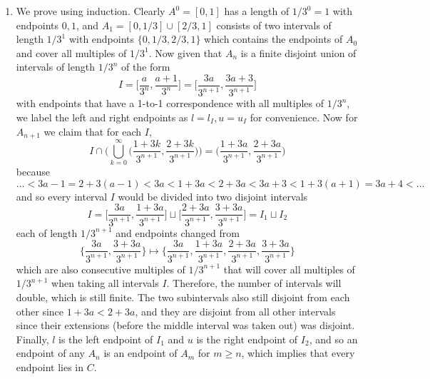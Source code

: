\begin{solution}
\begin{enumerate}
      \item We prove using induction. Clearly $A^0 = [0, 1]$ has a length of $ 1/3^0 = 1$ with endpoints $0, 1$, and $A_1 = [0, 1/3] \cup [2/3, 1]$ consists of two intervals of length $1/3^1$ with endpoints $\{0, 1/3, 2/3, 1\}$ which contains the endpoints of $A_0$ and cover all multiples of $1/3^1$. Now given that $A_n$ is a finite disjoint union of intervals of length $1/3^n$ of the form 
      \begin{equation}
        I = \bigg[ \frac{a}{3^n}, \frac{a+1}{3^n} \bigg] = \bigg[ \frac{3a}{3^{n+1}}, \frac{3a + 3}{3^{n+1}} \bigg]
      \end{equation}
      with endpoints that have a 1-to-1 correspondence with all multiples of $1/3^n$, we label the left and right endpoints as $l = l_I, u = u_I$ for convenience. Now for $A_{n+1}$ we claim that for each $I$, 
      \begin{equation}
        I \cap \bigg( \bigcup_{k=0}^\infty \Big( \frac{1 + 3k}{3^{n+1}}, \frac{2 + 3k}{3^{n+1}} \Big) \bigg) = \bigg( \frac{1 + 3a}{3^{n+1}}, \frac{2 + 3a}{3^{n+1}} \bigg)
      \end{equation}
      because 
      \begin{equation}
        \ldots < 3a - 1 = 2 + 3(a - 1) < 3a < 1 + 3a < 2 + 3a < 3a + 3 < 1 + 3(a + 1) = 3a + 4 < \ldots
      \end{equation} 
      and so every interval $I$ would be divided into two disjoint intervals 
      \begin{equation}
        I = \bigg[ \frac{3a}{3^{n+1}}, \frac{1 + 3a}{3^{n+1}} \bigg] \sqcup \bigg[ \frac{2 + 3a}{3^{n+1}}, \frac{3 + 3a}{3^{n+1}} \bigg] = I_1 \sqcup I_2
      \end{equation}
      each of length $1/3^{n+1}$ and endpoints changed from 
      \begin{equation}
        \bigg\{ \frac{3a}{3^{n+1}}, \frac{3 + 3a}{3^{n+1}} \bigg\} \mapsto \bigg\{ \frac{3a}{3^{n+1}}, \frac{1 + 3a}{3^{n+1}}, \frac{2 + 3a}{3^{n+1}}, \frac{3 + 3a}{3^{n+1}} \bigg\} 
      \end{equation}
      which are also consecutive multiples of $1/3^{n+1}$ that will cover all multiples of $1/3^{n+1}$ when taking all intervals $I$.  Therefore, the number of intervals will double, which is still finite. The two subintervals also still disjoint from each other since $1 + 3a < 2 + 3a$, and they are disjoint from all other intervals since their extensions (before the middle interval was taken out) was disjoint. Finally, $l$ is the left endpoint of $I_1$ and $u$ is the right endpoint of $I_2$, and so an endpoint of any $A_n$ is an endpoint of $A_m$ for $m \geq n$, which implies that every endpoint lies in $C$. 
      

\end{enumerate}
\end{solution}
